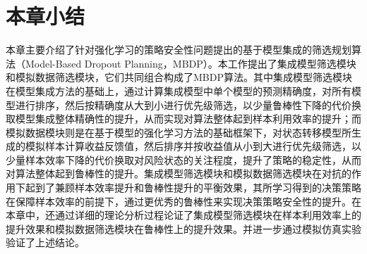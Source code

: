 \section{本章小结}

本章主要介绍了针对强化学习的策略安全性问题提出的基于模型集成的筛选规划算法（Model-Based Dropout Planning，MBDP）。本工作提出了集成模型筛选模块和模拟数据筛选模块，它们共同组合构成了MBDP算法。其中集成模型筛选模块在模型集成方法的基础上，通过计算集成模型中单个模型的预测精确度，对所有模型进行排序，然后按精确度从大到小进行优先级筛选，以少量鲁棒性下降的代价换取模型集成整体精确性的提升，从而实现对算法整体起到样本利用效率的提升；而模拟数据模块则是在基于模型的强化学习方法的基础框架下，对状态转移模型所生成的模拟样本计算收益反馈值，然后排序并按收益值从小到大进行优先级筛选，以少量样本效率下降的代价换取对风险状态的关注程度，提升了策略的稳定性，从而对算法整体起到鲁棒性的提升。集成模型筛选模块和模拟数据筛选模块在对抗的作用下起到了兼顾样本效率提升和鲁棒性提升的平衡效果，其所学习得到的决策策略在保障样本效率的前提下，通过更优秀的鲁棒性来实现决策策略安全性的提升。在本章中，还通过详细的理论分析过程论证了集成模型筛选模块在样本利用效率上的提升效果和模拟数据筛选模块在鲁棒性上的提升效果。并进一步通过模拟仿真实验验证了上述结论。